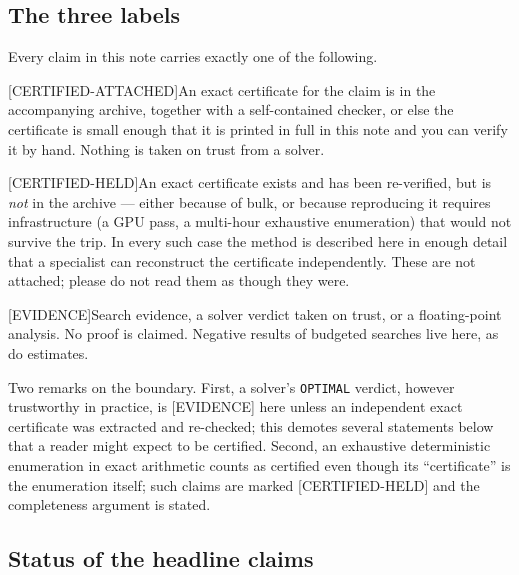 \documentclass[10pt,a4paper]{article}
\newcommand{\CA}{\textsf{[CERTIFIED-ATTACHED]}}
\newcommand{\CH}{\textsf{[CERTIFIED-HELD]}}
\newcommand{\EV}{\textsf{[EVIDENCE]}}
\begin{document}
\subsection{The three labels}

Every claim in this note carries exactly one of the following.

\noindent\CA{}\quad An exact certificate for the claim is in the accompanying archive, together
with a self-contained checker, or else the certificate is small enough that it is printed in full
in this note and you can verify it by hand. Nothing is taken on trust from a solver.

\smallskip
\noindent\CH{}\quad An exact certificate exists and has been re-verified, but is \emph{not} in the
archive --- either because of bulk, or because reproducing it requires infrastructure (a GPU pass,
a multi-hour exhaustive enumeration) that would not survive the trip. In every such case the method
is described here in enough detail that a specialist can reconstruct the certificate independently.
These are not attached; please do not read them as though they were.

\smallskip
\noindent\EV{}\quad Search evidence, a solver verdict taken on trust, or a floating-point analysis.
No proof is claimed. Negative results of budgeted searches live here, as do estimates.

Two remarks on the boundary. First, a solver's \texttt{OPTIMAL} verdict, however trustworthy in
practice, is \EV{} here unless an independent exact certificate was extracted and re-checked;
this demotes several statements below that a reader might expect to be certified. Second, an
exhaustive deterministic enumeration in exact arithmetic counts as certified even though its
``certificate'' is the enumeration itself; such claims are marked \CH{} and the completeness
argument is stated.

\subsection{Status of the headline claims}
\end{document}
